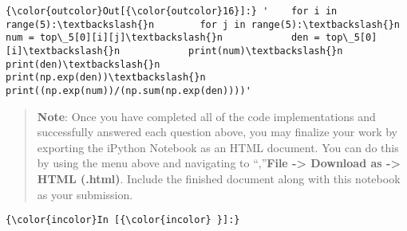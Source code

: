 \documentclass[11pt]{article}
\begin{document}
\begin{Verbatim}[commandchars=\\\{\}]
{\color{outcolor}Out[{\color{outcolor}16}]:} '    for i in range(5):\textbackslash{}n        for j in range(5):\textbackslash{}n            num = top\_5[0][i][j]\textbackslash{}n            den = top\_5[0][i]\textbackslash{}n            print(num)\textbackslash{}n            print(den)\textbackslash{}n            print(np.exp(den))\textbackslash{}n            print((np.exp(num))/(np.sum(np.exp(den))))'
\end{Verbatim}
            
    \begin{quote}
\textbf{Note}: Once you have completed all of the code implementations
and successfully answered each question above, you may finalize your
work by exporting the iPython Notebook as an HTML document. You can do
this by using the menu above and navigating to \n``,''\textbf{File
-\textgreater{} Download as -\textgreater{} HTML (.html)}. Include the
finished document along with this notebook as your submission.
\end{quote}

    \begin{Verbatim}[commandchars=\\\{\}]
{\color{incolor}In [{\color{incolor} }]:}  
\end{Verbatim}



    
    
    
    
\end{document}

